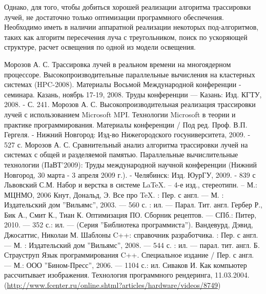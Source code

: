 \documentclass[12pt, a4paper, utf8]{article}
\begin{document}
Однако, для того, чтобы добиться хорошей реализации алгоритма трассировки лучей, не достаточно только оптимизации программного обеспечения. Необходимо иметь в наличии аппаратной реализации некоторых под-алгоритмов, таких как алгоритм пересечения луча с треугольником, поиск по ускоряющей структуре, расчет освещения по одной из модели освещения.


\newpage
\begin{thebibliography}{99}
	 Морозов А. С. Трассировка лучей в реальном времени на многоядерном процессоре. Высокопроизводительные параллельные вычисления на кластерных системах (HPC-2008). Материалы Восьмой Международной конференции -  семинара. Казань, ноябрь 17-19, 2008. Труды конференции — Казань: Изд. КГТУ, 2008. - С. 241.
	 Морозов А. С. Высокопроизводительная реализация трассировки лучей с использованием Microsoft MPI. Технологии Microsoft в теории и практике программирования. Материалы конференции / Под ред. Проф. В.П. Гергеля. - Нижний Новгород: Изд-во Нижегородского госуниверситета, 2009. - 527 с.
	 Морозов А. С. Сравнительный анализ алгоритма трассировки лучей на системах с общей и разделяемой памятью. Параллельные вычислительные технологии (ПаВТ’2009): Труды международной научной конференции (Нижний Новгород, 30 марта - 3 апреля 2009 г.). - Челябинск: Изд. ЮурГУ, 2009. - 839 с
	 Львовский С.М. Набор и верстка в системе \LaTeX. – 4-е изд., стереотипн. – М.: МЦНМО, 2006
	 Кнут, Дональд, Э. Все про \TeX. : Пер. с англ. --- М. : Издательский дом ''Вильямс'', 2003. --- 560 с. : ил. --- Парал. Тит. англ.
	 Гербер Р., Бик А., Смит К., Тиан К. Оптимизация ПО. Сборник рецептов. --- СПб.: Питер, 2010. --- 352 с.: ил. --- (Серия ''Библиотека программиста'').
	 Вандевурд, Дэвид, Джосаттис, Николаи М. Шаблоны C++: справочник разработчика. : Пер. с англ. --- М. : Издательский дом ''Вильямс'', 2008. --- 544 с. : ил. --- парал. тит. англ.
	 Б. Страуструп Язык программирования C++. Специальное издание / Пер. с англ. --- М.: ООО ''Бином-Пресс'', 2006. --- 1104 с.: ил.
	 Сиваков И. Как компьютер рассчитывает изображения. Технология программного рендеринга, 11.03.2004. \\ (\href{http://www.fcenter.ru/online.shtml?articles/hardware/videos/8749}{http://www.fcenter.ru/online.shtml?articles/hardware/videos/8749})

\end{thebibliography}
\end{document}
